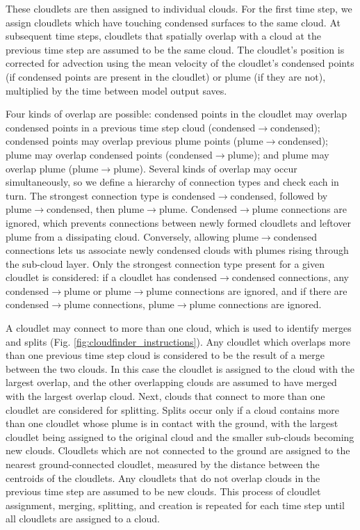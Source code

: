 \documentclass[acp]{copernicus}
\begin{document}
These cloudlets are then assigned to individual clouds.  For the first time 
step, we assign cloudlets which have touching condensed surfaces to the same 
cloud.  At subsequent time steps, cloudlets that spatially overlap with a cloud 
at the previous time step are assumed to be the same cloud.  The cloudlet's 
position is corrected for advection using the mean velocity of the cloudlet's 
condensed points (if condensed points are present in the cloudlet) or plume 
(if they are not), multiplied by the time between model output saves.

Four kinds of overlap are possible: condensed points in the cloudlet may 
overlap condensed points in a previous time step cloud 
(condensed$\rightarrow$condensed); condensed points may overlap previous 
plume points (plume$\rightarrow$condensed); plume may overlap condensed 
points (condensed$\rightarrow$plume); and plume may overlap plume 
(plume$\rightarrow$plume).  Several kinds of overlap may occur 
simultaneously, so we define a hierarchy of connection types and check each in 
turn.  The strongest connection type is condensed$\rightarrow$condensed, 
followed by plume$\rightarrow$condensed, then plume$\rightarrow$plume.  
Condensed$\rightarrow$plume connections are ignored, which prevents 
connections between newly formed cloudlets and leftover plume from a 
dissipating cloud.  Conversely, allowing plume$\rightarrow$condensed 
connections lets us associate newly condensed clouds with plumes rising through 
the sub-cloud layer.  Only the strongest connection type present for a given 
cloudlet is considered: if a cloudlet has condensed$\rightarrow$condensed 
connections, any condensed$\rightarrow$plume or plume$\rightarrow$plume 
connections are ignored, and if there are condensed$\rightarrow$plume 
connections, plume$\rightarrow$plume connections are ignored.  

A cloudlet may connect to more than one cloud, which is used to identify merges 
and splits (Fig. \ref{fig:cloudfinder_instructions}).  Any cloudlet which 
overlaps more than one previous time step cloud is considered to be the result 
of a merge between the two clouds.  In this case the cloudlet is assigned to 
the cloud with the largest overlap, and the other overlapping clouds are 
assumed to have merged with the largest overlap cloud.  Next, clouds that 
connect to more than one cloudlet are considered for splitting.  Splits occur 
only if a cloud contains more than one cloudlet whose plume is in contact with 
the ground, with the largest cloudlet being assigned to the original cloud and 
the smaller sub-clouds becoming new clouds. Cloudlets which are not connected 
to the ground are assigned to the nearest ground-connected cloudlet, measured 
by the distance between the centroids of the cloudlets.  Any cloudlets that do 
not overlap clouds in the previous time step are assumed to be new clouds.  
This process of cloudlet assignment, merging, splitting, and creation is 
repeated for each time step until all cloudlets are assigned to a cloud.
  
\end{document}
